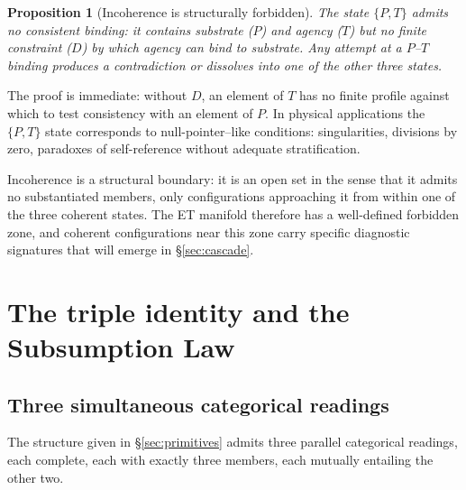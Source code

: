 \documentclass[11pt,a4paper]{article}
\newtheorem{proposition}[theorem]{Proposition}
\theoremstyle{definition}
\theoremstyle{remark}
\begin{document}
\begin{proposition}[Incoherence is structurally forbidden]\label{prop:incoherence}
The state $\{P,T\}$ admits no consistent binding: it contains substrate ($P$) and agency ($T$) but no finite constraint ($D$) by which agency can bind to substrate. Any attempt at a $P$--$T$ binding produces a contradiction or dissolves into one of the other three states.
\end{proposition}

The proof is immediate: without $D$, an element of $T$ has no finite profile against which to test consistency with an element of $P$. In physical applications the $\{P,T\}$ state corresponds to null-pointer--like conditions: singularities, divisions by zero, paradoxes of self-reference without adequate stratification.

Incoherence is a structural boundary: it is an open set in the sense that it admits no substantiated members, only configurations approaching it from within one of the three coherent states. The ET manifold therefore has a well-defined forbidden zone, and coherent configurations near this zone carry specific diagnostic signatures that will emerge in \S\ref{sec:cascade}.

\section{The triple identity and the Subsumption Law}\label{sec:triads}

\subsection{Three simultaneous categorical readings}

The structure given in \S\ref{sec:primitives} admits three parallel categorical readings, each complete, each with exactly three members, each mutually entailing the other two.
\end{document}
